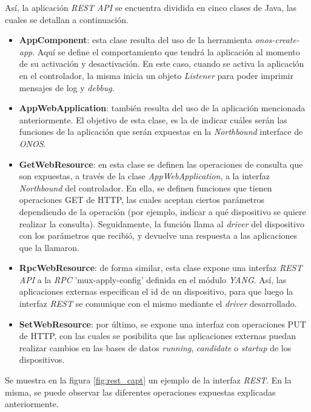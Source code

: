   Así, la aplicación \textit{REST API} se encuentra dividida en cinco clases de Java, las cuales se detallan a continuación. 


  \begin{itemize}
	\item \textbf{AppComponent}: esta clase resulta del uso de la herramienta \textit{onos-create-app}. Aquí se define el comportamiento que tendrá la aplicación al momento de su activación y desactivación. En este caso, cuando se activa la aplicación en el controlador, la misma inicia un objeto \textit{Listener} para poder imprimir mensajes de log y \textit{debbug}.
    
    \item \textbf{AppWebApplication}: también resulta del uso de la aplicación mencionada anteriormente. El objetivo de esta clase, es la de indicar cuáles serán las funciones de la aplicación que serán expuestas en la \textit{Northbound} interface de \textit{ONOS}.

    \item \textbf{GetWebResource}: en esta clase se definen las operaciones de consulta que son expuestas, a través de la clase \textit{AppWebApplication}, a la interfaz \textit{Northbound} del controlador. En ella, se definen funciones que tienen operaciones GET de HTTP, las cuales aceptan ciertos parámetros dependiendo de la operación (por ejemplo, indicar a qué dispositivo se quiere realizar la consulta). Seguidamente, la función llama al \textit{driver} del dispositivo con los parámetros que recibió,  y devuelve una respuesta a las aplicaciones que la llamaron.
    
    \item \textbf{RpcWebResource}: de forma similar, esta clase expone una interfaz \textit{REST API} a la \textit{RPC} 'mux-apply-config' definida en el módulo \textit{YANG}. Así, las aplicaciones externas especifican el id de un dispositivo, para que luego la interfaz \textit{REST} se comunique con el mismo mediante el \textit{driver} desarrollado. 
    
    \item \textbf{SetWebResource}: por último, se expone una interfaz con operaciones PUT de HTTP, con las cuales se posibilita que las aplicaciones externas puedan realizar cambios en las bases de datos \textit{running}, \textit{candidate} o \textit{startup} de los dispositivos.

\end{itemize}

Se muestra en la figura \ref{fig:rest_capt} un ejemplo de la interfaz \textit{REST}. En la misma, se puede observar las diferentes operaciones expuestas explicadas anteriormente.

